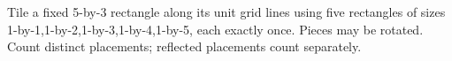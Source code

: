 Tile a fixed 5-by-3 rectangle along its unit grid lines using five rectangles of sizes 1-by-1,1-by-2,1-by-3,1-by-4,1-by-5, each exactly once. Pieces may be rotated. Count distinct placements; reflected placements count separately.
